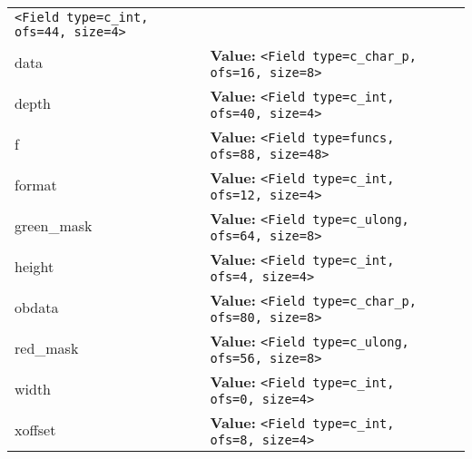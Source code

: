 \begin{longtable}{|p{\varnamewidth}|p{\vardescrwidth}|l}
{\tt {\textless}Field type=c\_int, ofs=44, size=4{\textgreater}}&\\
\cline{1-2}
\raggedright d\-a\-t\-a\- & \raggedright \textbf{Value:} 
{\tt {\textless}Field type=c\_char\_p, ofs=16, size=8{\textgreater}}&\\
\cline{1-2}
\raggedright d\-e\-p\-t\-h\- & \raggedright \textbf{Value:} 
{\tt {\textless}Field type=c\_int, ofs=40, size=4{\textgreater}}&\\
\cline{1-2}
\raggedright f\- & \raggedright \textbf{Value:} 
{\tt {\textless}Field type=funcs, ofs=88, size=48{\textgreater}}&\\
\cline{1-2}
\raggedright f\-o\-r\-m\-a\-t\- & \raggedright \textbf{Value:} 
{\tt {\textless}Field type=c\_int, ofs=12, size=4{\textgreater}}&\\
\cline{1-2}
\raggedright g\-r\-e\-e\-n\-\_\-m\-a\-s\-k\- & \raggedright \textbf{Value:} 
{\tt {\textless}Field type=c\_ulong, ofs=64, size=8{\textgreater}}&\\
\cline{1-2}
\raggedright h\-e\-i\-g\-h\-t\- & \raggedright \textbf{Value:} 
{\tt {\textless}Field type=c\_int, ofs=4, size=4{\textgreater}}&\\
\cline{1-2}
\raggedright o\-b\-d\-a\-t\-a\- & \raggedright \textbf{Value:} 
{\tt {\textless}Field type=c\_char\_p, ofs=80, size=8{\textgreater}}&\\
\cline{1-2}
\raggedright r\-e\-d\-\_\-m\-a\-s\-k\- & \raggedright \textbf{Value:} 
{\tt {\textless}Field type=c\_ulong, ofs=56, size=8{\textgreater}}&\\
\cline{1-2}
\raggedright w\-i\-d\-t\-h\- & \raggedright \textbf{Value:} 
{\tt {\textless}Field type=c\_int, ofs=0, size=4{\textgreater}}&\\
\cline{1-2}
\raggedright x\-o\-f\-f\-s\-e\-t\- & \raggedright \textbf{Value:} 
{\tt {\textless}Field type=c\_int, ofs=8, size=4{\textgreater}}&\\
\cline{1-2}
\end{longtable}



